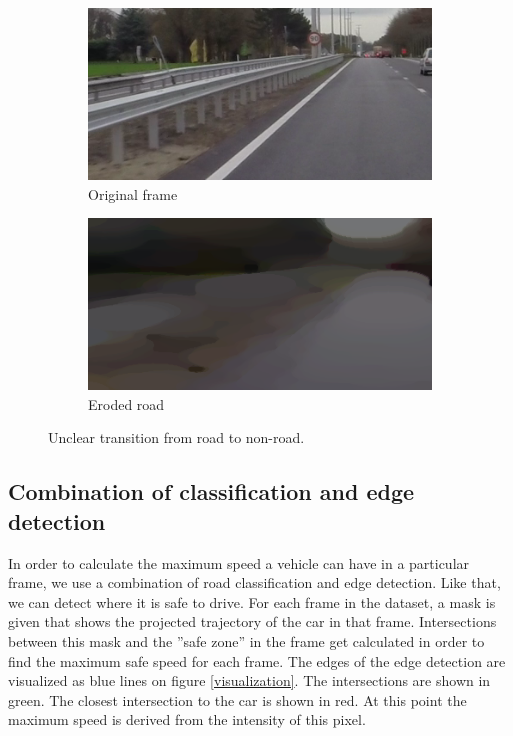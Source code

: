 \documentclass[runningheads,a4paper]{llncs}
\begin{document}
\begin{figure}[ht]
\centering
\begin{subfigure}{.5\textwidth}
  \centering
  \includegraphics[width=.9\textwidth]{fig/transition_road_dirt_original.png}
  \caption{Original frame\label{transition_road_dirt_original}}
\end{subfigure}%
\begin{subfigure}{.5\textwidth}
  \centering
  \includegraphics[width=.9\textwidth]{fig/transition_road_dirt_eroded.png}
  \caption{Eroded road\label{transition_road_dirt_eroded}}
\end{subfigure}
\caption{Unclear transition from road to non-road.}
\end{figure}

\subsection{Combination of classification and edge detection}\label{method-combination}

In order to calculate the maximum speed a vehicle can have in a particular frame, we use a combination of road classification and edge detection. Like that, we can detect where it is safe to drive. For each frame in the dataset, a mask is given that shows the projected trajectory of the car in that frame. Intersections between this mask and the ''safe zone'' in the frame get calculated in order to find the maximum safe speed for each frame. The edges of the edge detection are visualized as blue lines on figure \ref{visualization}. The intersections are shown in green. The closest intersection to the car is shown in red. At this point the maximum speed is derived from the intensity of this pixel. 
\end{document}
